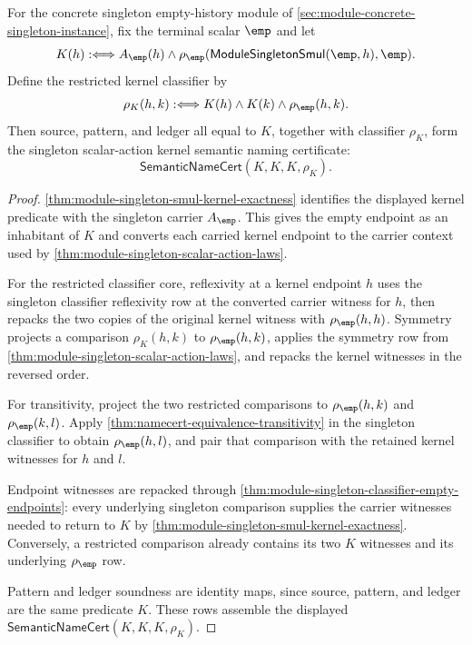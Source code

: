\begin{theorem}
\label{thm:module-singleton-smul-kernel-semantic-name-cert}
\label{thm:module-linearmap-kernel-semantic-name-cert}
For the concrete singleton empty-history module of
\autoref{sec:module-concrete-singleton-instance}, fix the terminal scalar
$\emp$ and let
$$
K(h):\Longleftrightarrow A_{\emp}(h)\land
\rho_{\emp}(\mathsf{ModuleSingletonSmul}(\emp,h),\emp).
$$
Define the restricted kernel classifier by
$$
\rho_K(h,k):\Longleftrightarrow K(h)\land K(k)\land \rho_{\emp}(h,k).
$$
Then source, pattern, and ledger all equal to $K$, together with classifier
$\rho_K$, form the singleton scalar-action kernel semantic naming certificate:
$$
\mathsf{SemanticNameCert}(K,K,K,\rho_K).
$$
\end{theorem}
\begin{proof}
\autoref{thm:module-singleton-smul-kernel-exactness} identifies the
displayed kernel predicate with the singleton carrier $A_{\emp}$. This gives
the empty endpoint as an inhabitant of $K$ and converts each carried kernel
endpoint to the carrier context used by
\autoref{thm:module-singleton-scalar-action-laws}.

For the restricted classifier core, reflexivity at a kernel endpoint $h$ uses
the singleton classifier reflexivity row at the converted carrier witness for
$h$, then repacks the two copies of the original kernel witness with
$\rho_{\emp}(h,h)$. Symmetry projects a comparison
$\rho_K(h,k)$ to $\rho_{\emp}(h,k)$, applies the symmetry row from
\autoref{thm:module-singleton-scalar-action-laws}, and repacks the
kernel witnesses in the reversed order.

For transitivity, project the two restricted comparisons to
$\rho_{\emp}(h,k)$ and $\rho_{\emp}(k,l)$. Apply
\autoref{thm:namecert-equivalence-transitivity} in the singleton classifier to
obtain $\rho_{\emp}(h,l)$, and pair that comparison with the retained kernel
witnesses for $h$ and $l$.

Endpoint witnesses are repacked through
\autoref{thm:module-singleton-classifier-empty-endpoints}: every underlying
singleton comparison supplies the carrier witnesses needed to return to $K$ by
\autoref{thm:module-singleton-smul-kernel-exactness}. Conversely, a
restricted comparison already contains its two $K$ witnesses and its underlying
$\rho_{\emp}$ row.

Pattern and ledger soundness are identity maps, since source, pattern, and
ledger are the same predicate $K$. These rows assemble the displayed
$\mathsf{SemanticNameCert}(K,K,K,\rho_K)$.
\end{proof}
